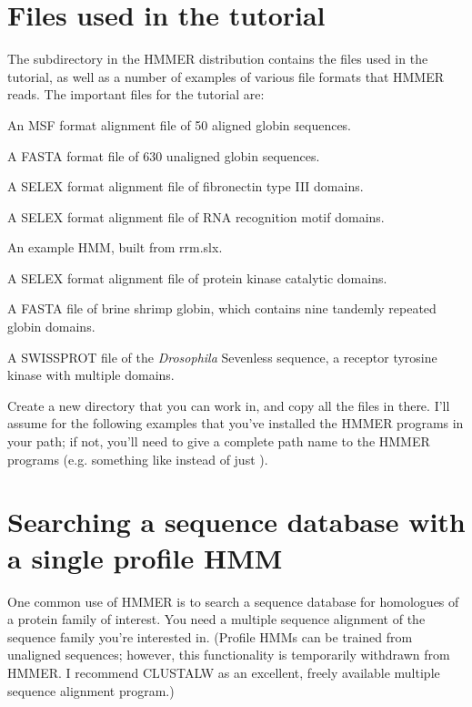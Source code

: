 \section{Files used in the tutorial}

The subdirectory  in the HMMER distribution contains the
files used in the tutorial, as well as a number of examples of various
file formats that HMMER reads. The important files for the tutorial
are:

\begin{wideitem}
\item[\emprog{globins50.msf}] An MSF format alignment file of 50 aligned globin sequences.
\item[\emprog{ globins630.fa}] A FASTA format file of 630 unaligned globin sequences.
\item[\emprog{ fn3.slx}] A SELEX format alignment file of fibronectin type III domains.
\item[\emprog{ rrm.slx}] A SELEX format alignment file of RNA recognition
motif domains.
\item[\emprog{ rrm.hmm}] An example HMM, built from rrm.slx.
\item[\emprog{ pkinase.slx}] A SELEX format alignment file of protein kinase
catalytic domains.
\item[\emprog{ Artemia.fa}] A FASTA file of brine shrimp globin, which contains
nine tandemly repeated globin domains.
\item[\emprog{ 7LES\_DROME}] A SWISSPROT file of the {\em Drosophila} 
Sevenless sequence, a receptor tyrosine kinase with multiple domains.
\end{wideitem}

Create a new directory that you can work in, and copy all the files in
 there. I'll assume for the following examples that you've
installed the HMMER programs in your path; if not, you'll need to give
a complete path name to the HMMER programs (e.g. something like  instead of just
).

\section{Searching a sequence database with a single profile HMM}

One common use of HMMER is to search a sequence database for
homologues of a protein family of interest. You need a multiple
sequence alignment of the sequence family you're interested in.
(Profile HMMs can be trained from unaligned sequences; however, this
functionality is temporarily withdrawn from HMMER. I recommend
CLUSTALW as an excellent, freely available multiple sequence alignment
program.)


